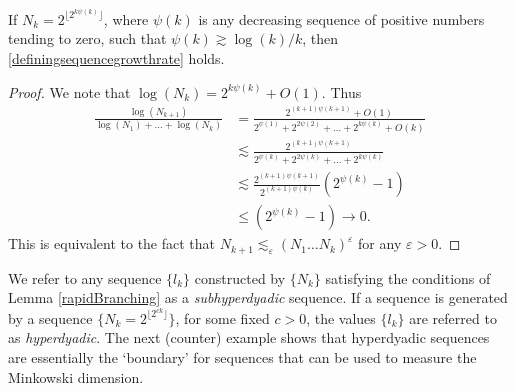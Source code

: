 \begin{lemma} \label{rapidBranching}
	If $N_k = 2^{\lfloor 2^{k \psi(k)} \rfloor}$, where $\psi(k)$ is any decreasing sequence of positive numbers tending to zero, such that $\psi(k) \gtrsim \log(k)/k$, then \eqref{definingsequencegrowthrate} holds.
\end{lemma}
\begin{proof}
	We note that $\log(N_k) = 2^{k \psi(k)} + O(1)$. Thus
	\begin{align*}
		\frac{\log(N_{k+1})}{\log(N_1) + \dots + \log(N_k)} &= \frac{2^{(k+1) \psi(k+1)} + O(1)}{2^{\psi(1)} + 2^{2 \psi(2)} + \dots + 2^{k \psi(k)} + O(k)}\\
		&\lesssim \frac{2^{(k+1) \psi(k+1)}}{2^{\psi(k)} + 2^{2 \psi(k)} + \dots + 2^{k \psi(k)}}\\
		&\lesssim \frac{2^{(k+1) \psi(k+1)}}{2^{(k+1) \psi(k)}} ( 2^{\psi(k)} - 1 )\\
		&\leq (2^{\psi(k)} - 1) \to 0.
	\end{align*}
	This is equivalent to the fact that $N_{k+1} \lesssim_\varepsilon (N_1 \dots N_k)^\varepsilon$ for any $\varepsilon > 0$.
\end{proof}
%
We refer to any sequence $\{ l_k \}$ constructed by $\{ N_k \}$ satisfying the conditions of Lemma \ref{rapidBranching} as a \emph{subhyperdyadic} sequence. If a sequence is generated by a sequence $\{ N_k = 2^{\lfloor 2^{ck} \rfloor} \}$, for some fixed $c > 0$, the values $\{ l_k \}$ are referred to as \emph{hyperdyadic}. The next (counter) example shows that hyperdyadic sequences are essentially the `boundary' for sequences that can be used to measure the Minkowski dimension.

